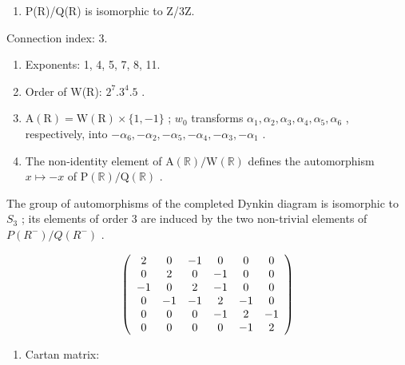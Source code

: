 \begin{enumerate}
\def\labelenumi{(\Roman{enumi})}
\setcounter{enumi}{7}
\tightlist
\item
  P(R)/Q(R) is isomorphic to Z/3Z.
\end{enumerate}

Connection index: 3.

\begin{enumerate}
\def\labelenumi{(\Roman{enumi})}
\setcounter{enumi}{8}
\item
  Exponents: 1, 4, 5, 7, 8, 11.
\item
  Order of W(R): \(2^{7}.3^{4}.5\) .
\item
  \(\mathrm{A}(\mathrm{R}) = \mathrm{W}(\mathrm{R}) \times \{1, -1\}\) ; \(w_0\) transforms \(\alpha_1, \alpha_2, \alpha_3, \alpha_4, \alpha_5, \alpha_6\) , respectively, into \(-\alpha_6, -\alpha_2, -\alpha_5, -\alpha_4, -\alpha_3, -\alpha_1\) .
\item
  The non-identity element of \(\mathrm{A}(\mathbb{R}) / \mathrm{W}(\mathbb{R})\) defines the automorphism \(x \mapsto -x\) of \(\mathrm{P}(\mathbb{R}) / \mathrm{Q}(\mathbb{R})\) .
\end{enumerate}

The group of automorphisms of the completed Dynkin diagram is isomorphic to \(S_{3}\) ; its elements of order 3 are induced by the two non-trivial elements of \(P(R^{-})/Q(R^{-})\) .

\[
\left( \begin{array}{c c c c c c} 2 & 0 & - 1 & 0 & 0 & 0 \\ 0 & 2 & 0 & - 1 & 0 & 0 \\ - 1 & 0 & 2 & - 1 & 0 & 0 \\ 0 & - 1 & - 1 & 2 & - 1 & 0 \\ 0 & 0 & 0 & - 1 & 2 & - 1 \\ 0 & 0 & 0 & 0 & - 1 & 2 \end{array} \right)
\]

\begin{enumerate}
\def\labelenumi{(\Roman{enumi})}
\setcounter{enumi}{12}
\tightlist
\item
  Cartan matrix:
\end{enumerate}

